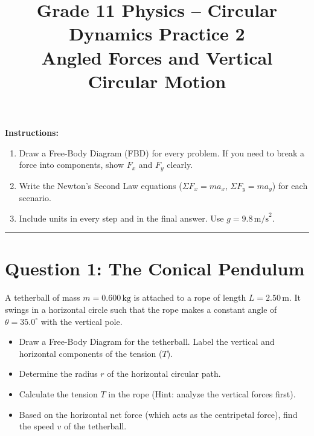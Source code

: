 \documentclass[12pt]{article}
\begin{document}
\title{Grade 11 Physics -- Circular Dynamics Practice 2 \\ \large{Angled Forces and Vertical Circular Motion}}
\author{}
\date{}
\maketitle

\vspace{1em}

\textbf{Instructions:}

\begin{enumerate}
\item Draw a Free-Body Diagram (FBD) for every problem. If you need to break a force into components, show $F_x$ and $F_y$ clearly.
\item Write the Newton's Second Law equations ($\Sigma F_x = m a_x$, $\Sigma F_y = m a_y$) for each scenario.
\item Include units in every step and in the final answer. Use $g = 9.8 \, \text{m/s}^2$. 
\end{enumerate}

\noindent\rule{\textwidth}{0.4pt}

\vspace{1em}

\newpage
\section*{Question 1: The Conical Pendulum}

A tetherball of mass $m = 0.600 \, \text{kg}$ is attached to a rope of length $L = 2.50 \, \text{m}$. It swings in a horizontal circle such that the rope makes a constant angle of $\theta = 35.0^\circ$ with the vertical pole. 

\begin{itemize}
\item[(a)] Draw a Free-Body Diagram for the tetherball. Label the vertical and horizontal components of the tension ($T$).
\vspace{4cm}

\item[(b)] Determine the radius $r$ of the horizontal circular path.
\vspace{4cm}

\item[(c)] Calculate the tension $T$ in the rope (Hint: analyze the vertical forces first).
\vspace{5cm}

\item[(d)] Based on the horizontal net force (which acts as the centripetal force), find the speed $v$ of the tetherball.
\vspace{6cm}

\end{itemize}
\end{document}
